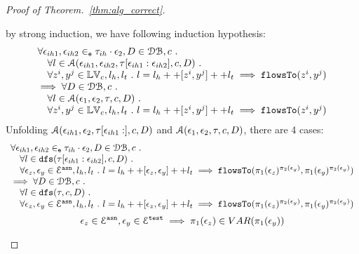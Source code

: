 \documentclass[a4paper,11pt]{article}
\begin{document}
\begin{proof}[Proof of Theorem.~\ref{thm:alg_correct}]
\begin{case}
\end{case}
%
\begin{case}
[$\trace = \event_1 \tracecat \trace_{ih} \cdot \event_2 \land \trace_{ih} \neq \cdot$]
by strong induction, we have following induction hypothesis:
%
\[
\begin{array}{l}
  \forall \mathtt{\epsilon}_{ih1}, \mathtt{\epsilon}_{ih2} \in_{\mathtt{e}} \mathtt{\tau}_{ih} \cdot \mathtt{\epsilon}_2, D \in \mathcal{DB} , c ~.~
  \\ \quad 
   \forall l \in \mathcal{A}(\mathtt{\epsilon}_{ih1}, \mathtt{\epsilon}_{ih2}, \mathtt{\tau}[\mathtt{\epsilon}_{ih1}:\mathtt{\epsilon}_{ih2}], c, D) ~.~
   \\ \quad 
   \forall z^i, y^j \in \mathbb{LV}_c, l_h, l_t ~.~ 
   l = l_h ++ [z^i, y^j] ++ l_t 
   \implies \mathtt{flowsTo}(z^i, y^j)
   \\
   \implies
   \forall D \in \mathcal{DB} , c ~.~
  \\ \quad 
   \forall l \in \mathcal{A}(\mathtt{\epsilon}_1, \mathtt{\epsilon}_2, \mathtt{\tau}, c, D) ~.~
   \\ \quad 
   \forall z^i, y^j \in \mathbb{LV}_c, l_h, l_t ~.~ 
   l = l_h ++ [z^i, y^j] ++ l_t 
   \implies \mathtt{flowsTo}(z^i, y^j)  
\end{array}
\]
%
Unfolding $\mathcal{A}(\mathtt{\epsilon}_{ih1}, \mathtt{\epsilon}_{2}, \mathtt{\tau}[\mathtt{\epsilon}_{ih1}:], c, D)$ and $\mathcal{A}(\mathtt{\epsilon}_1, \mathtt{\epsilon}_2, \mathtt{\tau}, c, D)$, there are 4 cases:
\begin{equation}
\begin{array}{l}
  \forall \mathtt{\epsilon}_{ih1}, \mathtt{\epsilon}_{ih2} \in_{\mathtt{e}} \mathtt{\tau}_{ih} \cdot \mathtt{\epsilon}_2, D \in \mathcal{DB} , c ~.~
  \\ \quad 
   \forall l \in \mathtt{dfs}(\mathtt{\tau}[\mathtt{\epsilon}_{ih1}:\mathtt{\epsilon}_{ih2}], c, D) ~.~
   \\ \quad 
   \forall \mathtt{\epsilon}_z, \mathtt{\epsilon}_y \in \mathcal{E}^{\mathtt{{asn}}}, l_h, l_t ~.~ 
   l = l_h ++ [\mathtt{\epsilon}_z, \mathtt{\epsilon}_y] ++ l_t 
   \implies \mathtt{flowsTo}(\pi_1(\mathtt{\epsilon}_z)^{\pi_2(\mathtt{\epsilon}_y)}, \pi_1(\mathtt{\epsilon}_y)^{\pi_2(\mathtt{\epsilon}_y)})
   \\
   \implies
   \forall D \in \mathcal{DB} , c ~.~
  \\ \quad 
   \forall l \in \mathtt{dfs}(\mathtt{\tau}, c, D) ~.~
   \\ \quad 
   \forall \mathtt{\epsilon}_z, \mathtt{\epsilon}_y \in \mathcal{E}^{\mathtt{{asn}}}, l_h, l_t ~.~ 
   l = l_h ++ [\mathtt{\epsilon}_z, \mathtt{\epsilon}_y] ++ l_t 
   \implies \mathtt{flowsTo}(\pi_1(\mathtt{\epsilon}_z)^{\pi_2(\mathtt{\epsilon}_y)}, \pi_1(\mathtt{\epsilon}_y)^{\pi_2(\mathtt{\epsilon}_y)})
\end{array}
\end{equation}
%
\begin{equation}
  \event_z \in \eventset^{\asn}, \event_y \in \eventset^{\test}
  \implies \pi_1(\event_z) \in VAR(\pi_1(\event_y))

\end{equation}
\end{case}
\end{proof}
\end{document}
